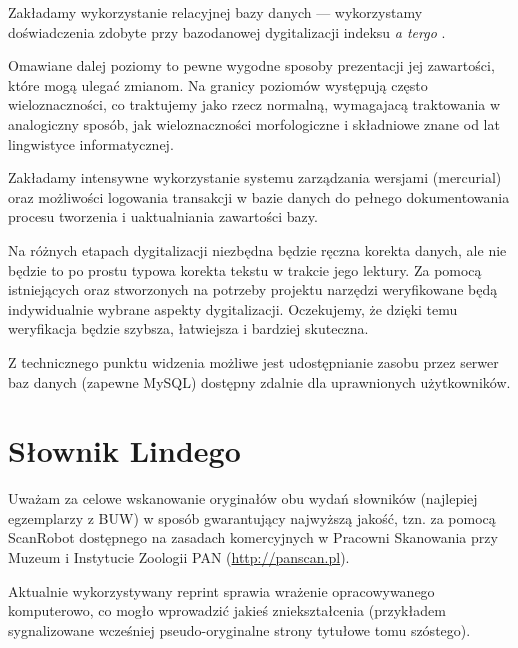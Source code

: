 \documentclass[12]{mwart}
\begin{document}
Zakładamy wykorzystanie relacyjnej bazy danych --- wykorzystamy
doświadczenia zdobyte przy bazodanowej dygitalizacji indeksu \textit{a
  tergo} \citep{bc379}. 

Omawiane dalej poziomy to pewne wygodne sposoby prezentacji jej
zawartości, które mogą ulegać zmianom. Na granicy poziomów występują
często wieloznaczności, co traktujemy jako rzecz normalną, wymagajacą
traktowania w analogiczny sposób, jak wieloznaczności morfologiczne i
składniowe znane od lat lingwistyce informatycznej.

Zakładamy intensywne wykorzystanie systemu zarządzania wersjami
(mercurial) oraz możliwości logowania transakcji w bazie danych do
pełnego dokumentowania procesu tworzenia i uaktualniania zawartości
bazy.

Na różnych etapach dygitalizacji niezbędna będzie ręczna korekta
danych, ale nie będzie to po prostu typowa korekta tekstu w trakcie
jego lektury. Za pomocą istniejących oraz stworzonych na potrzeby
projektu narzędzi weryfikowane będą indywidualnie wybrane aspekty
dygitalizacji. Oczekujemy, że dzięki temu weryfikacja będzie szybsza,
łatwiejsza i bardziej skuteczna.


Z technicznego punktu widzenia możliwe jest udostępnianie zasobu przez
serwer baz danych (zapewne MySQL) dostępny zdalnie dla uprawnionych
użytkowników.


\section{Słownik Lindego}
\label{sec:slownik-lindego}

Uważam za celowe wskanowanie oryginałów obu wydań słowników (najlepiej
egzemplarzy z BUW) w sposób gwarantujący najwyższą jakość, tzn. za
pomocą ScanRobot dostępnego na zasadach komercyjnych w Pracowni
Skanowania przy Muzeum i Instytucie Zoologii PAN (\url{http://panscan.pl}).

Aktualnie wykorzystywany reprint sprawia wrażenie opracowywanego
komputerowo, co mogło wprowadzić jakieś zniekształcenia (przykładem
sygnalizowane wcześniej pseudo-oryginalne strony tytułowe tomu
szóstego).
\end{document}
